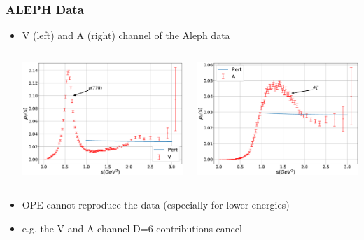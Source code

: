 \documentclass{beamer}
\begin{document}
\begin{frame}
  \frametitle{ALEPH Data}
  \begin{itemize}
    \item V (left) and A (right) channel of the Aleph data
    \begin{columns}
      \begin{column}{0.5\textwidth}
        \includegraphics[width=\textwidth]{./images/specFuncAleph_V.eps}
      \end{column}
      \begin{column}{0.5\textwidth}
        \includegraphics[width=\textwidth]{./images/specFuncAleph_A.eps}
      \end{column}
    \end{columns}
  \item OPE cannot reproduce the data (especially for lower energies)
  \item e.g. the V and A channel D=6 contributions cancel
  \end{itemize}
\end{frame}
\end{document}
